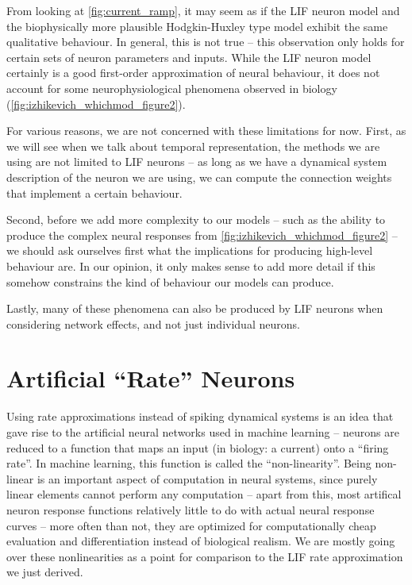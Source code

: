 \documentclass[10pt,letterpaper,oneside]{article}
\begin{document}
From looking at \cref{fig:current_ramp}, it may seem as if the LIF neuron model and the biophysically more plausible Hodgkin-Huxley type model exhibit the same qualitative behaviour. In general, this is not true -- this observation only holds for certain sets of neuron parameters and inputs. While the LIF neuron model certainly is a good first-order approximation of neural behaviour, it does not account for some neurophysiological phenomena observed in biology (\cref{fig:izhikevich_whichmod_figure2}).

For various reasons, we are not concerned with these limitations for now. First, as we will see when we talk about temporal representation, the methods we are using are not limited to LIF neurons -- as long as we have a dynamical system description of the neuron we are using, we can compute the connection weights that implement a certain behaviour.

Second, before we add more complexity to our models -- such as the ability to produce the complex neural responses from \cref{fig:izhikevich_whichmod_figure2} -- we should ask ourselves first what the implications for producing high-level behaviour are. In our opinion, it only makes sense to add more detail if this somehow constrains the kind of behaviour our models can produce.

Lastly, many of these phenomena can also be produced by LIF neurons when considering network effects, and not just individual neurons.

\newpage


\section{Artificial \enquote{Rate} Neurons}

Using rate approximations instead of spiking dynamical systems is an idea that gave rise to the artificial neural networks used in machine learning -- neurons are reduced to a function that maps an input (in biology: a current) onto a \enquote{firing rate}. In machine learning, this function is called the \enquote{non-linearity}. Being non-linear is an important aspect of computation in neural systems, since purely linear elements cannot perform any computation -- apart from this, most artifical neuron response functions relatively little to do with actual neural response curves --  more often than not, they are optimized for computationally cheap evaluation and differentiation instead of biological realism. We are mostly going over these nonlinearities as a point for comparison to the LIF rate approximation we just derived.
\end{document}
